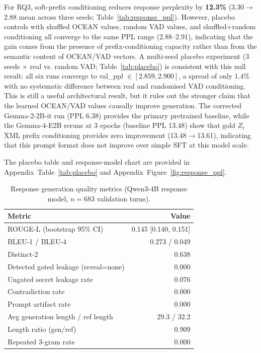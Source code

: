 \documentclass[11pt]{article}
\begin{document}
For RQ3, soft-prefix conditioning reduces response perplexity by \textbf{12.3\%} (3.30$\to$2.88 mean across three seeds; Table~\ref{tab:response_ppl}).
However, placebo controls with shuffled OCEAN values, random VAD values, and shuffled+random conditioning all converge to the same PPL range (2.88--2.91), indicating that the gain comes from the presence of prefix-conditioning capacity rather than from the semantic content of OCEAN/VAD vectors.
A multi-seed placebo experiment (3 seeds $\times$ real vs. random VAD; Table~\ref{tab:placebo}) is consistent with this null result: all six runs converge to val\_ppl $\in [2.859, 2.900]$, a spread of only $1.4\%$ with no systematic difference between real and randomised VAD conditioning.
This is still a useful architectural result, but it rules out the stronger claim that the learned OCEAN/VAD values causally improve generation.
The corrected Gemma-2-2B-it run (PPL 6.38) provides the primary pretrained baseline, while the Gemma-4-E2B reruns at 3 epochs (baseline PPL 13.48) show that gold $Z_t$ XML prefix conditioning provides zero improvement (13.48$\to$13.61), indicating that this prompt format does not improve over simple SFT at this model scale.

The placebo table and response-model chart are provided in Appendix~Table~\ref{tab:placebo} and Appendix~Figure~\ref{fig:response_ppl}.

\begin{table}[t]
\centering
\caption{Response generation quality metrics (Qwen3-4B response model, $n=683$ validation turns).}
\label{tab:response_quality}
\small
\begin{tabular}{@{}lr@{}}
\toprule
\textbf{Metric} & \textbf{Value} \\
\midrule
ROUGE-L (bootstrap 95\% CI) & 0.145 [0.140, 0.151] \\
BLEU-1 / BLEU-4 & 0.273 / 0.049 \\
Distinct-2 & 0.638 \\
Detected gated leakage (reveal=none) & 0.000 \\
Ungated secret leakage rate & 0.076 \\
Contradiction rate & 0.000 \\
Prompt artifact rate & 0.000 \\
Avg generation length / ref length & 29.3 / 32.2 \\
Length ratio (gen/ref) & 0.909 \\
Repeated 3-gram rate & 0.000 \\
\bottomrule
\end{tabular}
\end{table}
\end{document}
